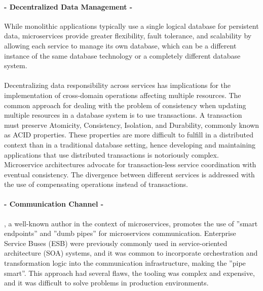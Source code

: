 \paragraph{- Decentralized Data Management -}

While monolithic applications typically use a single logical database for persistent data, microservices provide greater flexibility, fault tolerance,
and scalability by allowing each service to manage its own database, which can be a different instance of the same database technology or a completely different database system.

\paragraph{}

Decentralizing data responsibility across services has implications for the implementation of cross-domain operations affecting multiple resources.
The common approach for dealing with the problem of consistency when updating multiple resources in a database system is to use transactions.
A transaction must preserve Atomicity, Consistency, Isolation, and Durability, commonly known as ACID properties.
These properties are more difficult to fulfill in a distributed context than in a traditional database setting, hence developing and maintaining applications that use distributed transactions is notoriously complex.
Microservice architectures advocate for transaction-less service coordination with eventual consistency.
The divergence between different services is addressed with the use of compensating operations instead of transactions.

\paragraph{- Communication Channel -}

\citeauthor{microservices}, a well-known author in the context of microservices, promotes the use of ''smart endpoints'' and ''dumb pipes'' for microservices communication.
Enterprise Service Buses (ESB) \cite{esb} were previously commonly used in service-oriented architecture (SOA) systems,
and it was common to incorporate orchestration and transformation logic into the communication infrastructure,
making the ''pipe smart''.
This approach had several flaws, the tooling was complex and expensive, and it was difficult to solve problems in production environments.

\paragraph{}

